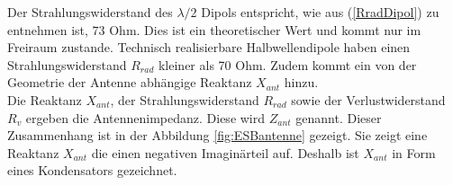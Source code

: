 Der Strahlungswiderstand des $\lambda/2$ Dipols entspricht, wie aus  (\ref{RradDipol}) zu entnehmen ist, 73 Ohm. Dies ist ein theoretischer Wert und  kommt  nur im Freiraum zustande. Technisch realisierbare Halbwellendipole haben einen Strahlungswiderstand $R_{rad}$ kleiner als 70 Ohm. Zudem kommt  ein von der  Geometrie der Antenne abhängige Reaktanz $X_{ant}$ hinzu.\\
Die Reaktanz $X_{ant}$,  der Strahlungswiderstand $R_{rad}$ sowie der Verlustwiderstand $R_v$ ergeben die Antennenimpedanz. Diese wird $Z_{ant}$  genannt. Dieser Zusammenhang ist  in der Abbildung \ref{fig:ESBantenne} gezeigt. Sie zeigt eine Reaktanz  $X_{ant}$ die einen negativen Imaginärteil auf. Deshalb ist $X_{ant}$ in Form eines Kondensators gezeichnet.

